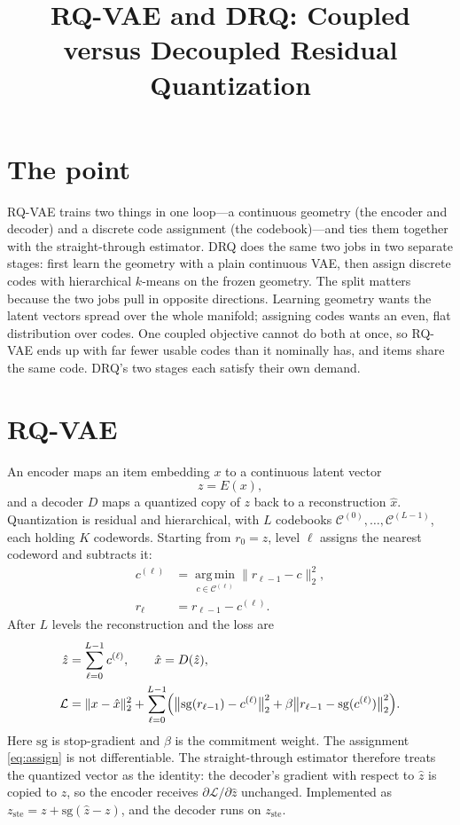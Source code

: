 \documentclass[11pt]{article}
\title{RQ-VAE and DRQ: Coupled versus Decoupled Residual Quantization}
\author{}
\date{}
\begin{document}
\maketitle

\section{The point}

RQ-VAE trains two things in one loop---a continuous geometry (the encoder and
decoder) and a discrete code assignment (the codebook)---and ties them together
with the straight-through estimator. DRQ does the same two jobs in two separate
stages: first learn the geometry with a plain continuous VAE, then assign
discrete codes with hierarchical $k$-means on the frozen geometry. The split
matters because the two jobs pull in opposite directions. Learning geometry
wants the latent vectors spread over the whole manifold; assigning codes wants
an even, flat distribution over codes. One coupled objective cannot do both at
once, so RQ-VAE ends up with far fewer usable codes than it nominally has, and
items share the same code. DRQ's two stages each satisfy their own demand.

\section{RQ-VAE}

An encoder maps an item embedding $x$ to a continuous latent vector
\begin{equation}
  z = E(x),
  \label{eq:enc}
\end{equation}
and a decoder $D$ maps a quantized copy of $z$ back to a reconstruction
$\hat x$. Quantization is residual and hierarchical, with $L$ codebooks
$\mathcal{C}^{(0)}, \dots, \mathcal{C}^{(L-1)}$, each holding $K$ codewords.
Starting from $r_0 = z$, level $\ell$ assigns the nearest codeword and subtracts
it:
\begin{align}
  c^{(\ell)} &= \operatorname*{arg\,min}_{c \in \mathcal{C}^{(\ell)}}
                \bigl\| r_{\ell-1} - c \bigr\|_2^2,
                \label{eq:assign} \\
  r_\ell &= r_{\ell-1} - c^{(\ell)}.
  \label{eq:residual}
\end{align}
After $L$ levels the reconstruction and the loss are
\begin{align}
  \hat z &= \sum_{\ell=0}^{L-1} c^{(\ell)},
  \qquad \hat x = D(\hat z),
  \label{eq:recon} \\
  \mathcal{L} &= \| x - \hat x \|_2^2
  + \sum_{\ell=0}^{L-1} \Bigl(
      \bigl\| \mathrm{sg}(r_{\ell-1}) - c^{(\ell)} \bigr\|_2^2
    + \beta \bigl\| r_{\ell-1} - \mathrm{sg}(c^{(\ell)}) \bigr\|_2^2
    \Bigr).
  \label{eq:loss}
\end{align}
Here $\mathrm{sg}$ is stop-gradient and $\beta$ is the commitment weight. The
assignment \eqref{eq:assign} is not differentiable. The straight-through
estimator therefore treats the quantized vector as the identity: the decoder's
gradient with respect to $\hat z$ is copied to $z$, so the encoder receives
$\partial \mathcal{L}/\partial \hat z$ unchanged. Implemented as
$z_{\mathrm{ste}} = z + \mathrm{sg}(\hat z - z)$, and the decoder runs on
$z_{\mathrm{ste}}$.
\end{document}
